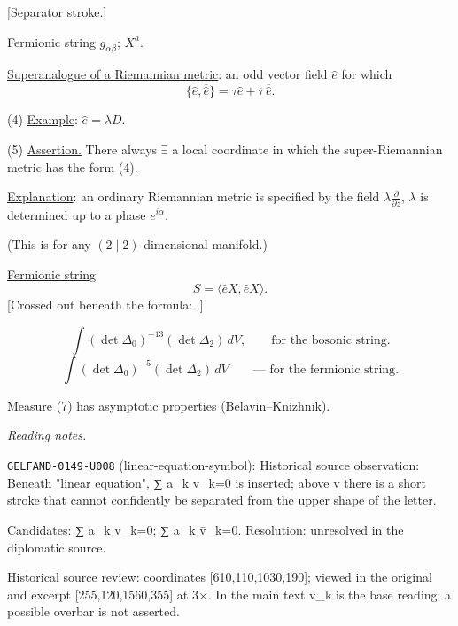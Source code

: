 [Separator stroke.]

Fermionic string \quad $g_{\alpha\beta}$; $X^a$.

\underline{Superanalogue of a Riemannian metric}: an odd vector field $\widehat e$ for which
\begin{equation*}
\{\widehat e,\overline{\widehat e}\}
=\tau\widehat e+\overline\tau\,\overline{\widehat e}.
\tag{3}
\end{equation*}

(4) \underline{Example}: $\widehat e=\lambda D$.

(5) \underline{Assertion.} There always $\exists$ a local coordinate in which the super-Riemannian metric has the form (4).

\underline{Explanation}: an ordinary Riemannian metric is specified by the field
$\lambda\frac{\partial}{\partial z}$, $\lambda$ is determined up to a phase $e^{i\alpha}$.

(This is for any $(2\mid2)$-dimensional manifold.)

\underline{Fermionic string}
\begin{equation*}
S=\langle\widehat eX,\widehat eX\rangle.
\tag{6}
\end{equation*}
[Crossed out beneath the formula:
.]

\begin{equation*}
\int(\det\Delta_0)^{-13}(\det\Delta_2)\,dV,
\qquad\text{for the bosonic string}.
\tag{7}
\end{equation*}
\begin{equation*}
\int(\det\Delta_0)^{-5}(\det\Delta_2)\,dV
\qquad\text{--- for the fermionic string}.
\tag{8}
\end{equation*}

Measure (7) has asymptotic properties (Belavin--Knizhnik).


\par\smallskip\noindent\textit{Reading notes.}\par
\noindent\texttt{GELFAND-0149-U008} (linear-equation-symbol): Historical source observation: Beneath "linear equation", ∑ a\_k v\_k=0 is inserted; above v there is a short stroke that cannot confidently be separated from the upper shape of the letter.\par
Candidates: ∑ a\_k v\_k=0; ∑ a\_k v̄\_k=0. Resolution: unresolved in the diplomatic source.\par
Historical source review: coordinates [610,110,1030,190]; viewed in the original and excerpt [255,120,1560,355] at 3×. In the main text v\_k is the base reading; a possible overbar is not asserted.\par

